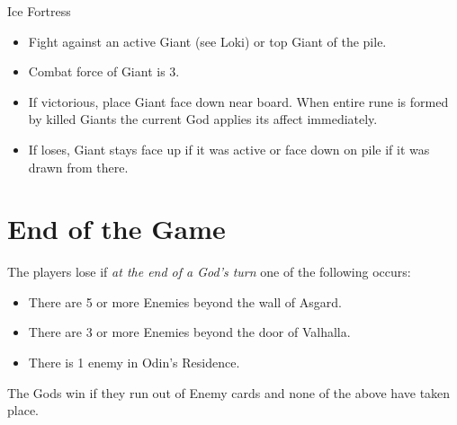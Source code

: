 \documentclass[12pt]{article}
\newenvironment{itemizeCustom}
{\begin{itemize}
  \setlength{\itemsep}{1pt}
  \setlength{\parskip}{0pt}
  \setlength{\parsep}{0pt}}
{\end{itemize}}
\begin{document}
\begin{mdframed}[style = customFrame]
\begin{multicols*}{2}
\noindent
Ice Fortress 
\begin{itemizeCustom}
	\item Fight against an active Giant (see Loki) or top Giant of the pile.
	\item Combat force of Giant is 3.
	\item If victorious, place Giant face down near board. When entire rune is formed by killed Giants the current God applies its affect immediately.
	\item If loses, Giant stays face up if it was active or face down on pile if it was drawn from there.
\end{itemizeCustom}

\section*{End of the Game}
The players lose if \emph{at the end of a God's turn} one of the following occurs:
\begin{itemizeCustom}
	\item There are 5 or more Enemies beyond the wall of Asgard.
	\item There are 3 or more Enemies beyond the door of Valhalla.
	\item There is 1 enemy in Odin's Residence.
\end{itemizeCustom}

\noindent
The Gods win if they run out of Enemy cards and none of the above have taken place.

\end{multicols*}
\end{mdframed}
\end{document}
